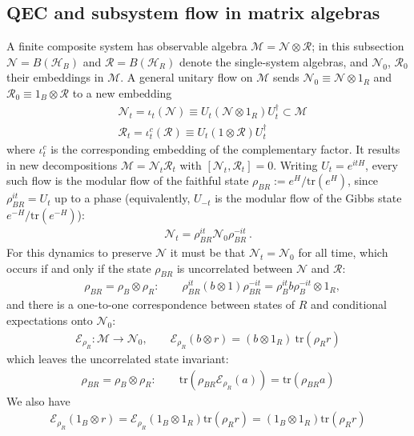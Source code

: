 \documentclass[a4paper,11pt]{article}
\theoremstyle{definition}
\newcommand{\nn}{\nonumber}
\newcommand{\tr}{\text{tr}}
\newcommand{\mE}{\mathcal{E}}
\begin{document}
\subsection{QEC and subsystem flow in matrix algebras}
A finite composite system has observable algebra $\mathcal M=\mathcal N\otimes\mathcal R$; in this subsection $\mathcal N=B(\mathcal H_B)$ and $\mathcal R=B(\mathcal H_R)$ denote the single-system algebras, and $\mathcal N_0$, $\mathcal R_0$ their embeddings in $\mathcal M$. A general unitary flow on $\mathcal M$ sends $\mathcal N_0\equiv \mathcal N\otimes 1_R$ and $\mathcal R_0\equiv 1_B\otimes \mathcal R$ to a new embedding
\begin{align}
&\mathcal N_t=\iota_t(\mathcal N)\equiv U_t(\mathcal N\otimes 1_R)U_t^\dagger\subset\mathcal M  \nn\\
&\mathcal R_t=\iota_t^c(\mathcal R)\equiv U_t(1\otimes \mathcal R)U_t^\dagger
\end{align}
where $\iota_t^c$ is the corresponding embedding of the complementary factor. It results in new decompositions $\mathcal M=\mathcal N_t\mathcal R_t$ with $[\mathcal N_t,\mathcal R_t]=0$.
Writing $U_t=e^{itH}$, every such flow is the modular flow of the faithful state $\rho_{BR}:=e^{H}/\tr(e^{H})$, since $\rho_{BR}^{it}=U_t$ up to a phase (equivalently, $U_{-t}$ is the modular flow of the Gibbs state $e^{-H}/\tr(e^{-H})$):
\begin{align}
    \mathcal N_t=\rho_{BR}^{it}\mathcal N_0\rho_{BR}^{-it}\ .
\end{align}
For this dynamics to preserve $\mathcal N$ it must be that $\mathcal N_t=\mathcal N_0$ for all time, which occurs if and only if the state $\rho_{BR}$ is uncorrelated between $\mathcal N$ and $\mathcal R$:
\begin{align}
 &   \rho_{BR}=\rho_B\otimes \rho_R:\qquad     \rho_{BR}^{it}(b\otimes 1)\rho_{BR}^{-it}=\rho_B^{it}b\rho_B^{-it}\otimes 1_R,
\end{align}
and there is a one-to-one correspondence between states of $R$ and conditional expectations onto $\mathcal N_0$:
\begin{align}
    \mE_{\rho_R}:\mathcal M\to \mathcal N_0, \qquad \mE_{\rho_R}(b\otimes r)=(b\otimes 1_R)\: \tr(\rho_R r)
\end{align}
which leaves the uncorrelated state invariant:
\begin{align}
    \rho_{BR}=\rho_B\otimes \rho_R:\qquad \tr(\rho_{BR}\mE_{\rho_R}(a))=\tr(\rho_{BR} a)
\end{align}
We also have
\begin{align}\label{KnillLaff}
    \mE_{\rho_R}(1_B\otimes r)=\mE_{\rho_R}(1_B\otimes 1_R)\tr(\rho_R r)=(1_B\otimes 1_R)\tr(\rho_R r)
\end{align}
\end{document}
